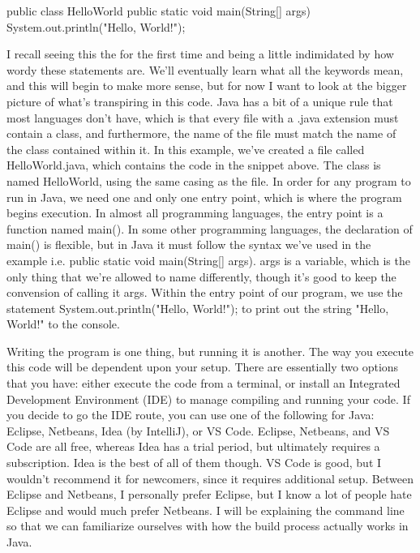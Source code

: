 \documentclass{article}
\begin{document}
\begin{jlst}
public class HelloWorld {
    public static void main(String[] args) {
        System.out.println("Hello, World!");
    }
}
\end{jlst}

I recall seeing this the for the first time and being a little indimidated by how wordy these statements are.
We’ll eventually learn what all the keywords mean, and this will begin to make more sense, but for now I want
to look at the bigger picture of what’s transpiring in this code. Java has a bit of a unique rule that most
languages don’t have, which is that every file with a .java extension must contain a class, and furthermore,
the name of the file must match the name of the class contained within it. In this example, we’ve created a
file called HelloWorld.java, which contains the code in the snippet above. The class is named HelloWorld,
using the same casing as the file. In order for any program to run in Java, we need one and only one entry
point, which is where the program begins execution. In almost all programming languages, the entry point is a
function named main(). In some other programming languages, the declaration of main() is flexible, but in Java
it must follow the syntax we’ve used in the example i.e. public static void main(String[] args). args is a
variable, which is the only thing that we’re allowed to name differently, though it’s good to keep the
convension of calling it args. Within the entry point of our program, we use the statement
System.out.println("Hello, World!"); to print out the string "Hello, World!" to the console.

Writing the program is one thing, but running it is another. The way you execute this code will be dependent
upon your setup. There are essentially two options that you have: either execute the code from a terminal, or
install an Integrated Development Environment (IDE) to manage compiling and running your code. If you decide to
go the IDE route, you can use one of the following for Java: Eclipse, Netbeans, Idea (by IntelliJ), or VS Code.
Eclipse, Netbeans, and VS Code are all free, whereas Idea has a trial period, but ultimately requires a
subscription. Idea is the best of all of them though. VS Code is good, but I wouldn’t recommend it for
newcomers, since it requires additional setup. Between Eclipse and Netbeans, I personally prefer Eclipse, but I
know a lot of people hate Eclipse and would much prefer Netbeans. I will be explaining the command line so
that we can familiarize ourselves with how the build process actually works in Java.
\end{document}
